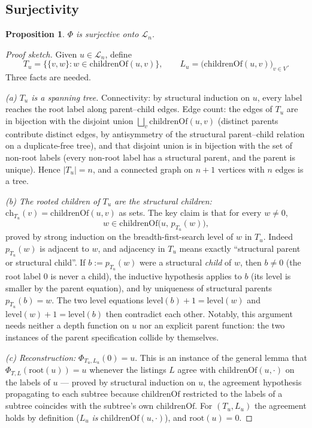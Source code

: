 \documentclass[11pt]{article}
\newtheorem{proposition}[theorem]{Proposition}
\theoremstyle{remark}
\theoremstyle{definition}
\begin{document}
\subsection{Surjectivity}

\begin{proposition}\label{prop:surj}
$\Phi$ is surjective onto $\mathcal{L}_n$.
\end{proposition}

\begin{proof}[Proof sketch]
Given $u \in \mathcal{L}_n$, define
\[
  T_u = \bigl\{ \{v, w\} : w \in \mathrm{childrenOf}(u,v) \bigr\},
  \qquad
  L_u = \bigl(\mathrm{childrenOf}(u,v)\bigr)_{v \in V}.
\]
Three facts are needed.

\emph{(a) $T_u$ is a spanning tree.}  Connectivity: by structural induction
on $u$, every label reaches the root label along parent--child edges.  Edge
count: the edges of $T_u$ are in bijection with the disjoint union
$\bigsqcup_v \mathrm{childrenOf}(u,v)$ (distinct parents contribute distinct
edges, by antisymmetry of the structural parent--child relation on a
duplicate-free tree), and that disjoint union is in bijection with the set of
non-root labels (every non-root label has a structural parent, and the parent
is unique).  Hence $|T_u| = n$, and a connected graph on $n+1$ vertices with
$n$ edges is a tree.

\emph{(b) The rooted children of $T_u$ are the structural children:}
$\mathrm{ch}_{T_u}(v) = \mathrm{childrenOf}(u,v)$ as sets.  The key claim is
that for every $w \neq 0$,
\[
  w \in \mathrm{childrenOf}\bigl(u,\, p_{T_u}(w)\bigr),
\]
proved by strong induction on the breadth-first-search level of $w$ in $T_u$.
Indeed $p_{T_u}(w)$ is adjacent to $w$, and adjacency in $T_u$ means exactly
``structural parent or structural child''.  If $b := p_{T_u}(w)$ were a
structural \emph{child} of $w$, then $b \neq 0$ (the root label $0$ is never a
child), the inductive hypothesis applies to $b$ (its level is smaller by the
parent equation), and by uniqueness of structural parents $p_{T_u}(b) = w$.
The two level equations
$\mathrm{level}(b) + 1 = \mathrm{level}(w)$ and
$\mathrm{level}(w) + 1 = \mathrm{level}(b)$
then contradict each other.  Notably, this argument needs neither a depth
function on $u$ nor an explicit parent function: the two instances of the
parent specification collide by themselves.

\emph{(c) Reconstruction:} $\Phi_{T_u, L_u}(0) = u$.  This is an instance of
the general lemma that $\Phi_{T,L}(\mathrm{root}(u)) = u$ whenever the
listings $L$ agree with $\mathrm{childrenOf}(u,\cdot)$ on the labels of $u$
--- proved by structural induction on $u$, the agreement hypothesis
propagating to each subtree because $\mathrm{childrenOf}$ restricted to the
labels of a subtree coincides with the subtree's own $\mathrm{childrenOf}$.
For $(T_u, L_u)$ the agreement holds by definition ($L_u$ \emph{is}
$\mathrm{childrenOf}(u,\cdot)$), and $\mathrm{root}(u) = 0$.
\end{proof}
\end{document}
